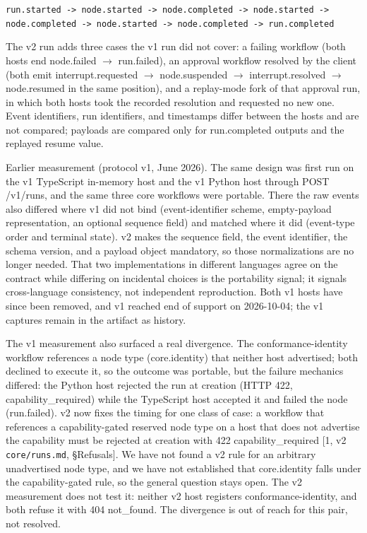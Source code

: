 \documentclass[11pt]{article}
\begin{document}
\begin{center}\small\texttt{run.started -> node.started -> node.completed -> node.started -> node.completed -> node.started -> node.completed -> run.completed}\end{center}
The v2 run adds three cases the v1 run did not cover: a failing workflow (both hosts end node.failed $\to$ run.failed), an approval workflow resolved by the client (both emit interrupt.requested $\to$ node.suspended $\to$ interrupt.resolved $\to$ node.resumed in the same position), and a replay-mode fork of that approval run, in which both hosts took the recorded resolution and requested no new one. Event identifiers, run identifiers, and timestamps differ between the hosts and are not compared; payloads are compared only for run.completed outputs and the replayed resume value.

Earlier measurement (protocol v1, June 2026). The same design was first run on the v1 TypeScript in-memory host and the v1 Python host through POST /v1/runs, and the same three core workflows were portable. There the raw events also differed where v1 did not bind (event-identifier scheme, empty-payload representation, an optional sequence field) and matched where it did (event-type order and terminal state). v2 makes the sequence field, the event identifier, the schema version, and a payload object mandatory, so those normalizations are no longer needed. That two implementations in different languages agree on the contract while differing on incidental choices is the portability signal; it signals cross-language consistency, not independent reproduction. Both v1 hosts have since been removed, and v1 reached end of support on 2026-10-04; the v1 captures remain in the artifact as history.

The v1 measurement also surfaced a real divergence. The conformance-identity workflow references a node type (core.identity) that neither host advertised; both declined to execute it, so the outcome was portable, but the failure mechanics differed: the Python host rejected the run at creation (HTTP 422, capability\_required) while the TypeScript host accepted it and failed the node (run.failed). v2 now fixes the timing for one class of case: a workflow that references a capability-gated reserved node type on a host that does not advertise the capability must be rejected at creation with 422 capability\_required [1, v2 \texttt{core/runs.md}, \S Refusals]. We have not found a v2 rule for an arbitrary unadvertised node type, and we have not established that core.identity falls under the capability-gated rule, so the general question stays open. The v2 measurement does not test it: neither v2 host registers conformance-identity, and both refuse it with 404 not\_found. The divergence is out of reach for this pair, not resolved.
\end{document}
